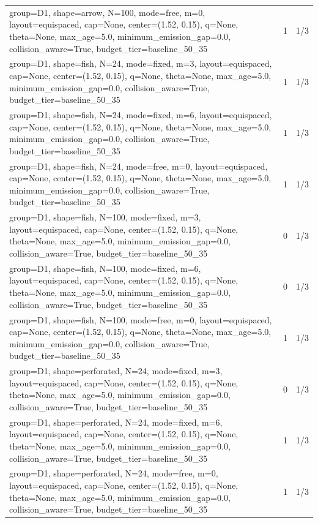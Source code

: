\begin{tabular}{p{11cm}rr}
group=D1, shape=arrow, N=100, mode=free, m=0, layout=equispaced, cap=None, center=(1.52, 0.15), q=None, theta=None, max\_age=5.0, minimum\_emission\_gap=0.0, collision\_aware=True, budget\_tier=baseline\_50\_35 & 1 & 1/3 \\
group=D1, shape=fish, N=24, mode=fixed, m=3, layout=equispaced, cap=None, center=(1.52, 0.15), q=None, theta=None, max\_age=5.0, minimum\_emission\_gap=0.0, collision\_aware=True, budget\_tier=baseline\_50\_35 & 1 & 1/3 \\
group=D1, shape=fish, N=24, mode=fixed, m=6, layout=equispaced, cap=None, center=(1.52, 0.15), q=None, theta=None, max\_age=5.0, minimum\_emission\_gap=0.0, collision\_aware=True, budget\_tier=baseline\_50\_35 & 1 & 1/3 \\
group=D1, shape=fish, N=24, mode=free, m=0, layout=equispaced, cap=None, center=(1.52, 0.15), q=None, theta=None, max\_age=5.0, minimum\_emission\_gap=0.0, collision\_aware=True, budget\_tier=baseline\_50\_35 & 1 & 1/3 \\
group=D1, shape=fish, N=100, mode=fixed, m=3, layout=equispaced, cap=None, center=(1.52, 0.15), q=None, theta=None, max\_age=5.0, minimum\_emission\_gap=0.0, collision\_aware=True, budget\_tier=baseline\_50\_35 & 0 & 1/3 \\
group=D1, shape=fish, N=100, mode=fixed, m=6, layout=equispaced, cap=None, center=(1.52, 0.15), q=None, theta=None, max\_age=5.0, minimum\_emission\_gap=0.0, collision\_aware=True, budget\_tier=baseline\_50\_35 & 0 & 1/3 \\
group=D1, shape=fish, N=100, mode=free, m=0, layout=equispaced, cap=None, center=(1.52, 0.15), q=None, theta=None, max\_age=5.0, minimum\_emission\_gap=0.0, collision\_aware=True, budget\_tier=baseline\_50\_35 & 1 & 1/3 \\
group=D1, shape=perforated, N=24, mode=fixed, m=3, layout=equispaced, cap=None, center=(1.52, 0.15), q=None, theta=None, max\_age=5.0, minimum\_emission\_gap=0.0, collision\_aware=True, budget\_tier=baseline\_50\_35 & 0 & 1/3 \\
group=D1, shape=perforated, N=24, mode=fixed, m=6, layout=equispaced, cap=None, center=(1.52, 0.15), q=None, theta=None, max\_age=5.0, minimum\_emission\_gap=0.0, collision\_aware=True, budget\_tier=baseline\_50\_35 & 1 & 1/3 \\
group=D1, shape=perforated, N=24, mode=free, m=0, layout=equispaced, cap=None, center=(1.52, 0.15), q=None, theta=None, max\_age=5.0, minimum\_emission\_gap=0.0, collision\_aware=True, budget\_tier=baseline\_50\_35 & 1 & 1/3 \\

\end{tabular}
